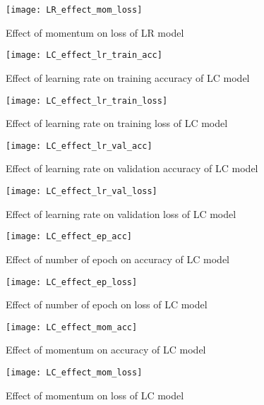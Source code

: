 \documentclass[12pt, a4paper, twoside]{article}
\begin{document}
\begin{figure}[p]
	\centering
	\texttt{[image: LR\_effect\_mom\_loss]}
	\caption{Effect of momentum on loss of LR model}
	\label{F:LR_effect_mom_loss}
\end{figure}
\begin{figure}[p]
	\centering
	\texttt{[image: LC\_effect\_lr\_train\_acc]}
	\caption{Effect of learning rate on training accuracy of LC model}
	\label{F:LC_effect_lr_train_acc}
\end{figure}
\begin{figure}[p]
	\centering
	\texttt{[image: LC\_effect\_lr\_train\_loss]}
	\caption{Effect of learning rate on training loss of LC model}
	\label{F:LC_effect_lr_train_loss}
\end{figure}
\begin{figure}[p]
	\centering
	\texttt{[image: LC\_effect\_lr\_val\_acc]}
	\caption{Effect of learning rate on validation accuracy of LC model}
	\label{F:LC_effect_lr_val_acc}
\end{figure}
\begin{figure}[p]
	\centering
	\texttt{[image: LC\_effect\_lr\_val\_loss]}
	\caption{Effect of learning rate on validation loss of LC model}
	\label{F:LC_effect_lr_val_loss}
\end{figure}
\begin{figure}[p]
	\centering
	\texttt{[image: LC\_effect\_ep\_acc]}
	\caption{Effect of number of epoch on  accuracy of LC model}
	\label{F:LC_effect_ep_acc}
\end{figure}
\begin{figure}[p]
	\centering
	\texttt{[image: LC\_effect\_ep\_loss]}
	\caption{Effect of number of epoch on loss of LC model}
	\label{F:LC_effect_ep_loss}
\end{figure}
\begin{figure}[p]
	\centering
	\texttt{[image: LC\_effect\_mom\_acc]}
	\caption{Effect of momentum on  accuracy of LC model}
	\label{F:LC_effect_mom_acc}
\end{figure}
\begin{figure}[p]
	\centering
	\texttt{[image: LC\_effect\_mom\_loss]}
	\caption{Effect of momentum on loss of LC model}
	\label{F:LC_effect_mom_loss}
\end{figure}

\printbibliography
\end{document}

